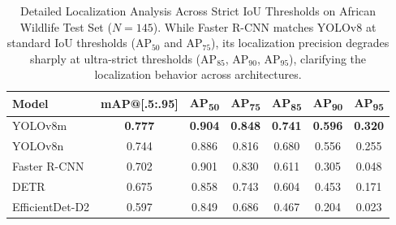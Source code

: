 \begin{table}[htbp]
\centering
\caption{Detailed Localization Analysis Across Strict IoU Thresholds on African Wildlife Test Set ($N=145$). While Faster R-CNN matches YOLOv8 at standard IoU thresholds ($\text{AP}_{50}$ and $\text{AP}_{75}$), its localization precision degrades sharply at ultra-strict thresholds ($\text{AP}_{85}$, $\text{AP}_{90}$, $\text{AP}_{95}$), clarifying the localization behavior across architectures.}
\label{tab:high_iou_localization}
\small
\renewcommand{\arraystretch}{1.2}
\begin{tabular}{lcccccc}
\toprule
\textbf{Model} & \textbf{mAP@[.5:.95]} & \textbf{AP\textsubscript{50}} & \textbf{AP\textsubscript{75}} & \textbf{AP\textsubscript{85}} & \textbf{AP\textsubscript{90}} & \textbf{AP\textsubscript{95}} \\
\midrule
YOLOv8m & \textbf{0.777} & \textbf{0.904} & \textbf{0.848} & \textbf{0.741} & \textbf{0.596} & \textbf{0.320} \\
YOLOv8n & 0.744 & 0.886 & 0.816 & 0.680 & 0.556 & 0.255 \\
Faster R-CNN & 0.702 & 0.901 & 0.830 & 0.611 & 0.305 & 0.048 \\
DETR & 0.675 & 0.858 & 0.743 & 0.604 & 0.453 & 0.171 \\
EfficientDet-D2 & 0.597 & 0.849 & 0.686 & 0.467 & 0.204 & 0.023 \\
\bottomrule
\end{tabular}
\end{table}
